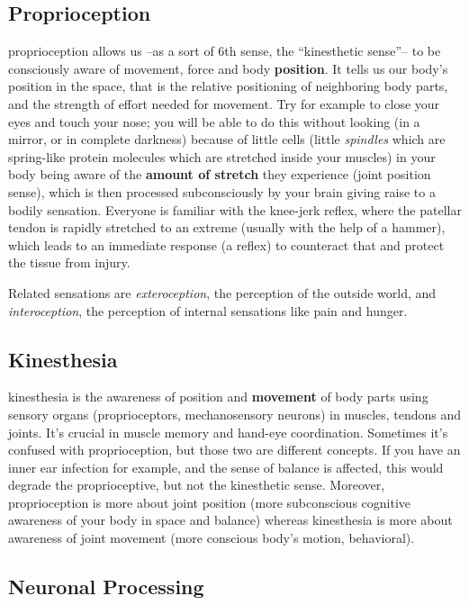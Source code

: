 \subsection{Proprioception}\label{subsec:proprioception}

\Gls{proprioception} allows us --as a sort of 6th sense, the ``kinesthetic sense''-- to be consciously aware of movement, force and body \textbf{position}.
It tells us our body's position in the space, that is the relative positioning of neighboring body parts, and the strength of effort needed for movement.
Try for example to close your eyes and touch your nose; you will be able to do this without looking (in a mirror, or in complete darkness) because of little cells (little \textit{spindles} which are spring-like protein molecules which are stretched inside your muscles) in your body being aware of the \textbf{amount of stretch} they experience (joint position sense), which is then processed subconsciously by your brain giving raise to a bodily sensation.
Everyone is familiar with the knee-jerk reflex, where the patellar tendon is rapidly stretched to an extreme (usually with the help of a hammer), which leads to an immediate response (a reflex) to counteract that and protect the tissue from injury.

Related sensations are \textit{exteroception}, the perception of the outside world, and \textit{interoception}, the perception of internal sensations like pain and hunger.

\subsection{Kinesthesia}\label{subsec:kinesthesia}

\Gls{kinesthesia} is the awareness of position and \textbf{movement} of body parts using sensory organs (proprioceptors, mechanosensory neurons) in muscles, tendons and joints.
It's crucial in muscle memory and hand-eye coordination.
Sometimes it's confused with proprioception, but those two are different concepts.
If you have an inner ear infection for example, and the sense of balance is affected, this would degrade the proprioceptive, but not the kinesthetic sense.
Moreover, proprioception is more about joint position (more subconscious cognitive awareness of your body in space and balance) whereas kinesthesia is more about awareness of joint movement (more conscious body's motion, behavioral).

\subsection{Neuronal Processing}\label{subsec:neuronal-processing}

